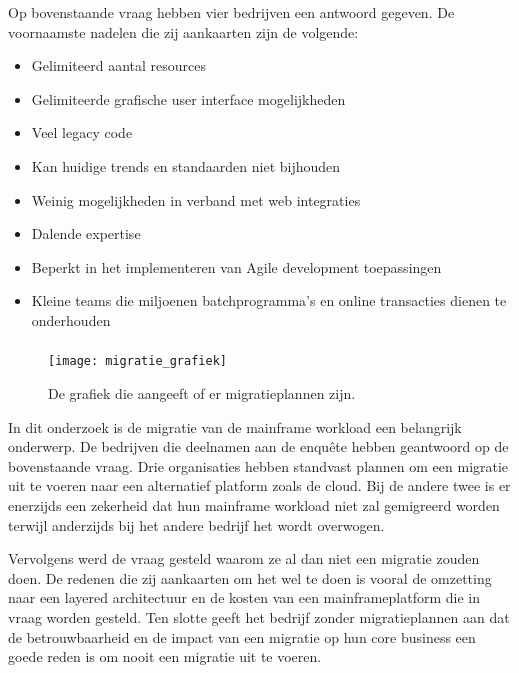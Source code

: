 Op bovenstaande vraag hebben vier bedrijven een antwoord gegeven. De voornaamste nadelen die zij aankaarten zijn de volgende:
  \begin{itemize}
     \item Gelimiteerd aantal resources 
     \item Gelimiteerde grafische user interface mogelijkheden
     \item Veel legacy code 
     \item Kan huidige trends en standaarden niet bijhouden
     \item Weinig mogelijkheden in verband met web integraties
     \item Dalende expertise
     \item Beperkt in het implementeren van Agile development toepassingen
     \item Kleine teams die miljoenen batchprogramma's en online transacties dienen te onderhouden
 \end{itemize}

\subsubsection{}
\label{sec:Heeft de organisatie migratieplannen?}

 \begin{figure}[h]
    \centering
    \texttt{[image: migratie\_grafiek]}
    \caption{De grafiek die aangeeft of er migratieplannen zijn.}
    \label{fig: migratieplannen}
\end{figure}


In dit onderzoek is de migratie van de mainframe workload een belangrijk onderwerp. De bedrijven die deelnamen aan de enquête hebben geantwoord op de bovenstaande vraag. Drie organisaties hebben standvast plannen om een migratie uit te voeren naar een alternatief platform zoals de cloud. Bij de andere twee is er enerzijds een zekerheid dat hun mainframe workload niet zal gemigreerd worden terwijl anderzijds bij het andere bedrijf het wordt overwogen. 

Vervolgens werd de vraag gesteld waarom ze al dan niet een migratie zouden doen. De redenen die zij aankaarten om het wel te doen is vooral de omzetting naar een layered architectuur en de kosten van een mainframeplatform die in vraag worden gesteld. Ten slotte geeft het bedrijf zonder migratieplannen aan dat de betrouwbaarheid en de impact van een migratie op hun core business een goede reden is om nooit een migratie uit te voeren. 

